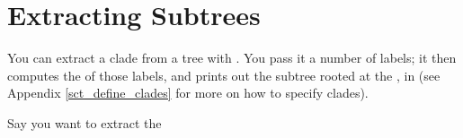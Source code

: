 

\section{Extracting Subtrees}
\label{sct_subtrees}

You can extract a clade from a tree with \clade. You pass it a number of
labels; it then computes the \lca{} of those labels, and prints out the subtree
rooted at the \lca, in \nw (see Appendix \ref{sct_define_clades} for more on
how to specify clades).


Say you want to extract the 

